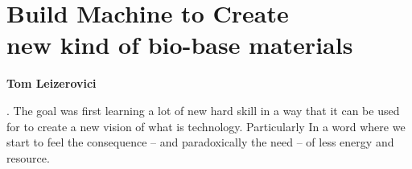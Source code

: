 \chapter*{\centering \Huge Build Machine to Create \\
new kind of bio-base materials }

\begin{center}
    \textbf{Tom Leizerovici} 
\end{center} 
. The goal was first learning a lot of new hard skill in a way that it can be used for to create a new vision of what is technology. Particularly In a word where we start to feel the consequence -- and paradoxically the need -- 
of less energy and resource. 



\pagebreak

